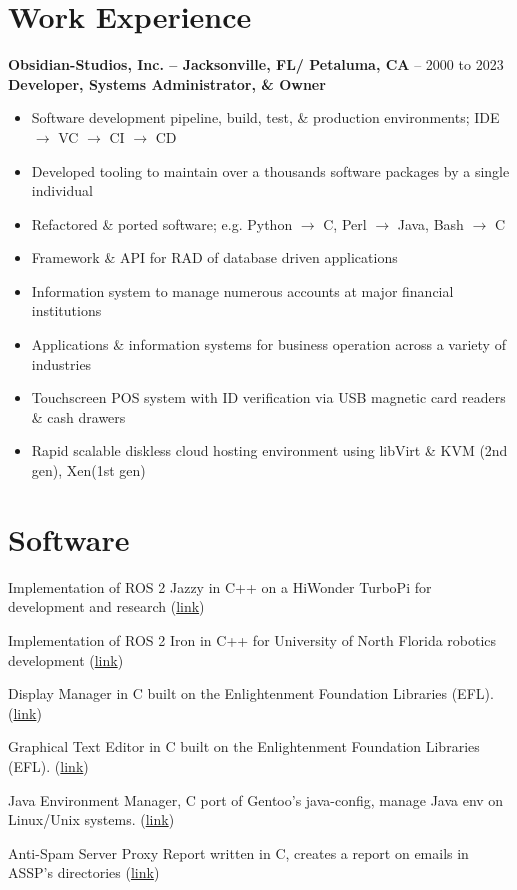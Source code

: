 \documentclass[10pt]{report}
\begin{document}
\section*{Work Experience}
\textbf{Obsidian-Studios, Inc. – Jacksonville, FL/ Petaluma, CA} – 2000 to 2023\newline
\textbf{Developer, Systems Administrator, \& Owner}
\begin{itemize}
  \item Software development pipeline, build, test, \& production environments; IDE $\rightarrow$ VC $\rightarrow$ CI $\rightarrow$ CD
  \item Developed tooling to maintain over a thousands software packages by a single individual
  \item Refactored \& ported software; e.g. Python $\rightarrow$ C, Perl $\rightarrow$ Java, Bash $\rightarrow$ C
  \item Framework \& API for RAD of database driven applications
  \item Information system to manage numerous accounts at major financial institutions
  \item Applications \& information systems for business operation across a variety of industries
  \item Touchscreen POS system with ID verification via USB magnetic card readers \& cash drawers
  \item Rapid scalable diskless cloud hosting environment using libVirt \& KVM (2nd gen), Xen(1st gen)

\end{itemize}

\section*{Software}
\begin{description}[style=multiline,leftmargin=7em]
  \item [turbopi\_ros] Implementation of ROS 2 Jazzy in C++ on a HiWonder TurboPi for development and research (\href{https://github.com/wltjr/turbopi_ros}{link})
  \item [osprey\_ros] Implementation of ROS 2 Iron in C++ for University of North Florida robotics development (\href{https://github.com/Osprey-Robotics/osprey_ros}{link})
  \item [entrance] Display Manager in C built on the Enlightenment Foundation Libraries (EFL). (\href{https://github.com/Obsidian-StudiosInc/entrance}{link})
  \item [ecrire] Graphical Text Editor in C built on the Enlightenment Foundation Libraries (EFL). (\href{https://github.com/Obsidian-StudiosInc/ecrire}{link})
  \item [jem] Java Environment Manager, C port of Gentoo's java-config, manage Java env on Linux/Unix systems. (\href{https://github.com/Obsidian-StudiosInc/jem}{link})
  \item [asspr] Anti-Spam Server Proxy Report written in C, creates a report on emails in ASSP's directories (\href{https://github.com/Obsidian-StudiosInc/asspr}{link})
\end{description}
\end{document}
